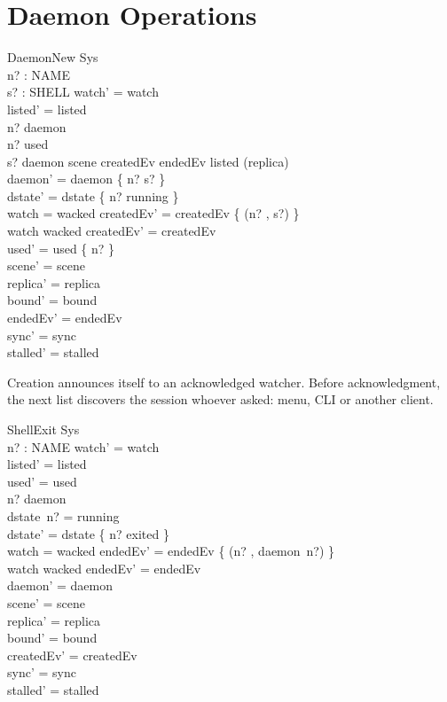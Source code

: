 \documentclass[a4paper,10pt,fleqn]{article}
\begin{document}
\section{Daemon Operations}

\begin{schema}{DaemonNew}
  \Delta Sys \\
  n? : NAME \\
  s? : SHELL
\where
  watch' = watch \\
  listed' = listed \\
  n? \notin \dom daemon \\
  n? \notin used \\
  s? \notin \ran daemon \cup \ran scene \cup \ran createdEv \cup
    \ran endedEv \cup \ran listed \cup \ran (\dom replica) \\
  daemon' = daemon \cup \{ n? \mapsto s? \} \\
  dstate' = dstate \cup \{ n? \mapsto running \} \\
  watch = wacked \implies createdEv' = createdEv \cup \{ (n? , s?) \} \\
  watch \neq wacked \implies createdEv' = createdEv \\
  used' = used \cup \{ n? \} \\
  scene' = scene \\
  replica' = replica \\
  bound' = bound \\
  endedEv' = endedEv \\
  sync' = sync \\
  stalled' = stalled
\end{schema}

Creation announces itself to an acknowledged watcher. Before acknowledgment,
the next list discovers the session whoever asked: menu, CLI or another client.

\begin{schema}{ShellExit}
  \Delta Sys \\
  n? : NAME
\where
  watch' = watch \\
  listed' = listed \\
  used' = used \\
  n? \in \dom daemon \\
  dstate~n? = running \\
  dstate' = dstate \oplus \{ n? \mapsto exited \} \\
  watch = wacked \implies endedEv' = endedEv \cup \{ (n? , daemon~n?) \} \\
  watch \neq wacked \implies endedEv' = endedEv \\
  daemon' = daemon \\
  scene' = scene \\
  replica' = replica \\
  bound' = bound \\
  createdEv' = createdEv \\
  sync' = sync \\
  stalled' = stalled
\end{schema}
\end{document}
